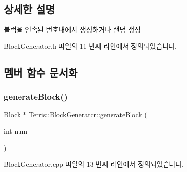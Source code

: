 \subsection{상세한 설명}
블럭을 연속된 번호내에서 생성하거나 랜덤 생성 

Block\+Generator.\+h 파일의 11 번째 라인에서 정의되었습니다.



\subsection{멤버 함수 문서화}
\mbox{\label{class_tetris_1_1_block_generator_a581b22cebe170d3fe8b51130c01e7a22}} 
\subsubsection{\texorpdfstring{generate\+Block()}{generateBlock()}\hspace{0.1cm}{\footnotesize\ttfamily [1/2]}}
{\footnotesize\ttfamily \hyperlink{class_tetris_1_1_block}{Block} $\ast$ Tetris\+::\+Block\+Generator\+::generate\+Block (\begin{DoxyParamCaption}\item[{int}]{num }\end{DoxyParamCaption})}



Block\+Generator.\+cpp 파일의 13 번째 라인에서 정의되었습니다.



